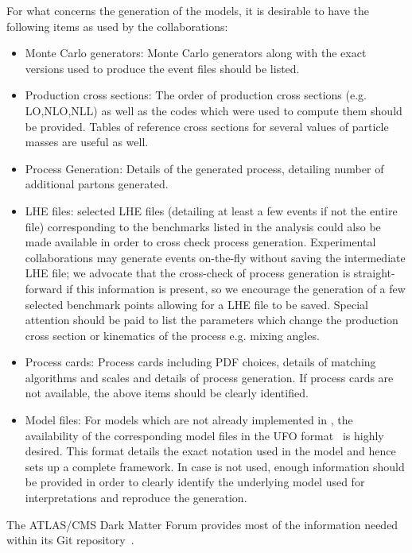For what concerns the generation of the models, it is desirable to have the following items as used by the collaborations:
\begin {itemize}
	\item Monte Carlo generators: Monte Carlo generators along with the exact versions used to produce the event files should be listed. 
	\item Production cross sections: The order of production cross sections (e.g. LO,NLO,NLL) as well as the codes which were used to compute them should be provided. Tables of reference cross sections for several values of particle masses are useful as well. 
	\item Process Generation: Details of the generated process, detailing number of additional partons generated. 
	\item LHE files: selected LHE files (detailing at least a few events if not the entire file) corresponding to the benchmarks listed in the analysis could also be made available in order to cross check process generation. Experimental collaborations may generate events on-the-fly without saving the intermediate LHE file; we advocate that the cross-check of process generation is straight-forward if this information is present, so we encourage the generation of a few selected benchmark points allowing for a LHE file to be saved. Special attention should be paid to list the parameters which change the production cross section or kinematics of the process e.g. mixing angles. 
	\item Process cards: Process cards including  PDF choices, details of matching algorithms and scales and details of process generation. If process cards are not available, the above items should be clearly identified. 
	\item Model files: For models which are not already implemented in \madgraph, the availability of the corresponding model files in the UFO format~\cite{Degrande:2011ua} is highly desired. This format details the exact notation used in the model and hence sets up a complete framework. In case \madgraph is not used, enough information should be provided in order to clearly identify the underlying model used for interpretations and reproduce the generation. 
\end{itemize}
The ATLAS/CMS Dark Matter Forum provides most of the information needed within its Git repository~\cite{ForumSVN}. 

